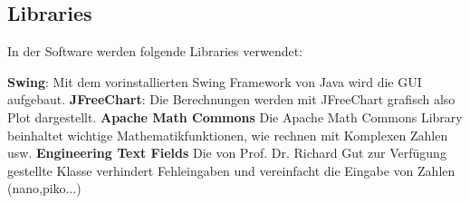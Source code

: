 \begin{comment}
\begin{figure}[H]
	\centering
	\texttt{[image: GUIFile.png]}
	\caption{Menuoption File}
	\label{fig:GUIFile}
\end{figure}

\bigskip

\paragraph{Simulation} \label{para:simulation}
Im Menupunkt "Simulation" kann die Simulationsart Monte Carlo ausgewählt werden(F8, Tabelle:\ref{tab:ziele}). Es öffnet sich ein neues Fenster in dem der Parameter, die Toleranz und die Anzahl Messungen eingestellt werden kann. Dieser Menupunkt ist in der Abbildung \ref{fig:GUISimulation} dargestellt.

\begin{figure}[H]
	\centering
	\texttt{[image: GUISimulation.png]}
	\caption{Menuoption Simulation}
	\label{fig:GUISimulation}
\end{figure}


\paragraph{Help} \label{para:Help}
Im Menupunkt "Help" können die beiden CM- und DM äquivalenten Schaltungsmodelle, die zur Berechnung verwendet werden, in einem seperaten Fenster dargestellt werden(G5, Tabelle:\ref{tab:ziele}). Dieser Menupunkt ist in der Abbildung \ref{fig:GUIHelp} \nameref{fig:GUIHelp} dargestellt.

\begin{figure}[H]
	\centering
	\texttt{[image: GUIHelp.png]}
	\caption{Menuoption Help}
	\label{fig:GUIHelp}
\end{figure}
\shorthandon{"}

\end{comment}


\subsection{Libraries} \label{subsec:Libraries}

In der Software werden folgende Libraries verwendet:

\textbf{Swing}: Mit dem vorinstallierten Swing Framework von Java wird die GUI aufgebaut.
\textbf{JFreeChart}: Die Berechnungen werden mit JFreeChart grafisch also Plot dargestellt. \cite{jfreechart}
\textbf{Apache Math Commons} Die Apache Math Commons Library beinhaltet wichtige Mathematikfunktionen, wie rechnen mit Komplexen Zahlen usw. \cite{apache}
\textbf{Engineering Text Fields} Die von Prof. Dr. Richard Gut zur Verfügung gestellte Klasse verhindert Fehleingaben und vereinfacht die Eingabe von Zahlen (nano,piko...)

\newpage